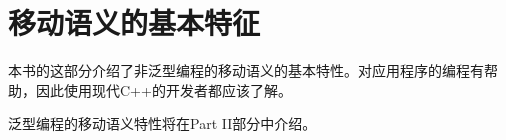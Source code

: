 \part{移动语义的基本特征}
本书的这部分介绍了非泛型编程的移动语义的基本特性。对应用程序的编程有帮助，因此使用现代C++的开发者都应该了解。

泛型编程的移动语义特性将在Part II部分中介绍。









